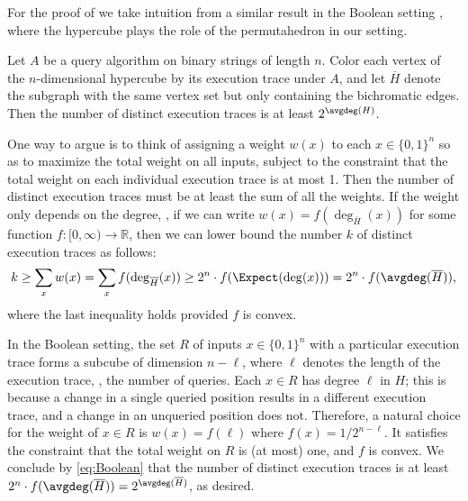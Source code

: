 \documentclass{toc}
\begin{document}
For the proof of  we take intuition from a similar result in the Boolean setting \cite[Exercise~8.43]{ODonnell2014}, where the hypercube plays the role of the permutahedron in our setting.
\begin{fact}\label{fact:Boolean} 
Let $A$ be a query algorithm on binary strings of length $n$. Color each vertex of the $n$-dimensional hypercube by its execution trace under $A$, and let $\overline{H}$ denote the subgraph with the same vertex set but only containing the bichromatic edges. Then the number of distinct execution traces is at least $2^{\avgdeg(H)}$.
\end{fact}

One way to argue  is to think of assigning a weight $w(x)$ to each $x \in \{0,1\}^n$ so as to maximize the total weight on all inputs, subject to the constraint that the total weight on each individual execution trace is at most 1. Then the number of distinct execution traces must be at least the sum of all the weights. If the weight only depends on the degree, \ie, if we can write $w(x) = f(\deg_{\overline{H}}(x))$ for some function $f: [0,\infty) \to \mathbb{R}$, then we can lower bound the number $k$ of distinct execution traces as follows:
\begin{equation}\label{eq:Boolean}
k \ge \sum_x w(x) = \sum_x f(\deg_{\overline{H}}(x)) \ge 2^n \cdot f(\Expect(\deg(x))) = 2^n \cdot f(\avgdeg(\overline{H})),
\end{equation}
where the last inequality holds provided $f$ is convex. 

In the Boolean setting, the set $R$ of inputs $x \in \{0,1\}^n$ with a particular execution trace forms a subcube of dimension $n-\ell$, where $\ell$ denotes the length of the execution trace, \ie, the number of queries. Each $x \in R$ has degree $\ell$ in $H$; this is because a change in a single queried position results in a different execution trace, and a change in an unqueried position does not. Therefore, a natural choice for the weight of $x \in R$ is $w(x) = f(\ell)$ where $f(x) = 1/2^{n-\ell}$. It satisfies the constraint that the total weight on $R$ is (at most) one, and $f$ is convex. We conclude by \eqref{eq:Boolean} that the number of distinct execution traces is at least $2^n \cdot f(\avgdeg(\overline{H})) = 2^{\avgdeg(\overline{H})}$, as desired.
\end{document}
